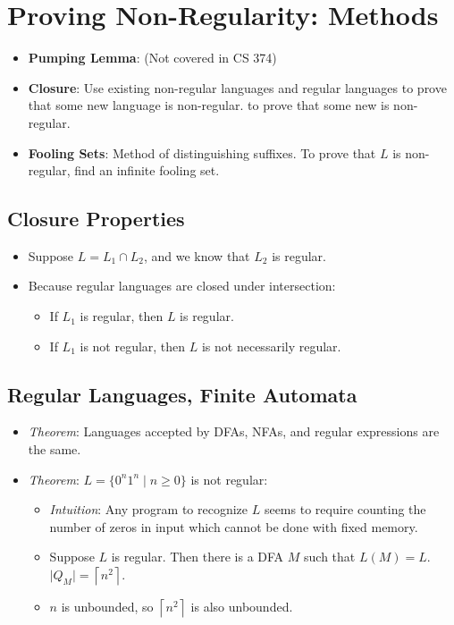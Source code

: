
\section{Proving Non-Regularity: Methods}
\begin{itemize}
    \item \textbf{Pumping Lemma}: (Not covered in CS 374)
    \item \textbf{Closure}: Use existing non-regular languages and regular languages to prove that some new language is non-regular. to prove that some new  is non-regular.
    \item \textbf{Fooling Sets}: Method of distinguishing suffixes. To prove that $L$ is non-regular, find an infinite fooling set.
\end{itemize}

\subsection{Closure Properties}
\begin{itemize}
    \item Suppose $L = L_1 \cap L_2$, and we know that $L_2$ is regular.
    \item Because regular languages are closed under intersection:
    \begin{itemize}
        \item If $L_1$ is regular, then $L$ is regular.
        \item If $L_1$ is not regular, then $L$ is not necessarily regular.
    \end{itemize}
\end{itemize}

\subsection{Regular Languages, Finite Automata}
\begin{itemize}
    \item \textit{Theorem}: Languages accepted by DFAs, NFAs, and regular expressions are the same.
    \item \textit{Theorem}: $L = \{ 0^n 1^n \mid n \geq 0 \}$ is not regular:
    \begin{itemize}
        \item \textit{Intuition}: Any program to recognize $L$ seems to require counting the number of zeros in input which cannot be done with fixed memory.
        \item Suppose $L$ is regular. Then there is a DFA $M$ such that $L(M) = L$. $\lvert Q_M \rvert = \left \lceil{n^2}\right \rceil$.
        \item $n$ is unbounded, so $\left \lceil{n^2}\right \rceil$ is also unbounded.
    \end{itemize}
\end{itemize}


